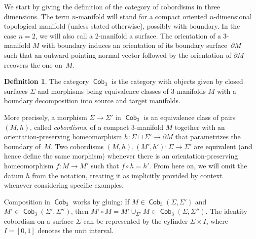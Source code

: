 \documentclass[pdftex]{sigma}
\DeclareMathOperator{\Cob}{\mathsf{Cob}}
\numberwithin{equation}{section}
\theoremstyle{definition}
\newtheorem{Definition}[Definition]{Definition}
\begin{document}
We start by giving the definition of the category of cobordisms in three dimensions. The term $n$-manifold will stand for a compact oriented $n$-dimensional topological manifold (unless stated otherwise), possibly with boundary.
In the case $n = 2$, we will also call a 2-manifold a surface. The orientation of a 3-manifold $M$ with boundary induces an orientation of its boundary surface~$\partial M$ such that an outward-pointing normal vector followed by the orientation of $\partial M$ recovers the one on~$M$.
\begin{Definition}\label{defCob}
The category $\Cob_3$ is the category with objects given by closed surfaces $\Sigma$ and morphisms being equivalence classes of 3-manifolds $M$ with a boundary decomposition into source and target manifolds.

More precisely, a morphism $\Sigma \rightarrow \Sigma'$ in $\Cob_3$ is an equivalence class of pairs $(M, h)$, called \textit{cobordisms}, of a compact 3-manifold $M$ together with an orientation-preserving homeomorphism $h\colon \overline{\Sigma} \sqcup \Sigma'\! \rightarrow \partial M$ that parametrizes the boundary of~$M$. Two cobordisms $(M,h), (M',h')\colon {\Sigma \rightarrow \Sigma'}$ are equivalent (and hence define the same morphism) whenever there is an orientation-preserving homeomorphism $f\colon M \rightarrow M'$ such that $f \circ h = h'$. From here on, we will omit the datum $h$ from the notation, treating it as implicitly provided by context whenever considering specific examples.

 Composition in $\Cob_3$ works by gluing: If $M \in \Cob_3(\Sigma, \Sigma')$ and $M' \in \Cob_3(\Sigma', \Sigma'')$, then $M' \circ M = M' \cup_{\Sigma'} M \in \Cob_3(\Sigma, \Sigma'')$. The identity cobordism on a surface $\Sigma$ can be represented by the cylinder $\Sigma \times I$, where $I = [0,1]$ denotes the unit interval.
\end{Definition}
\end{document}
